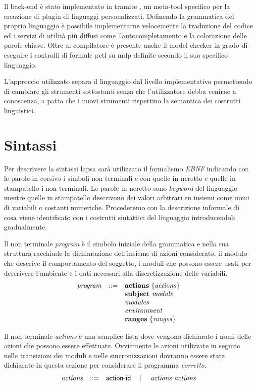 Il back-end è stato implementato in \java{} tramite \xtext{} \cite{xtext}, un meta-tool specifico per la creazione di plugin \eclipse{} di linguaggi personalizzati. Definendo la grammatica del proprio linguaggio è possibile implementarne velocemente la traduzione del codice ed i servizi di utilità più diffusi come l'autocompletamento e la colorazione delle parole chiave. Oltre al compilatore è presente anche il model checker \prism{} in grado di eseguire i controlli di formule \ac{pctl} su \ac{mdp} definite secondo il suo specifico linguaggio.

L'approccio utilizzato separa il linguaggio dal livello implementativo permettendo di cambiare gli strumenti sottostanti senza che l'utilizzatore debba venirne a conoscenza, a patto che i nuovi strumenti rispettino la semantica dei costrutti linguistici.

\section{Sintassi}
Per descrivere la sintassi \ac{lapsa} sarà utilizzato il formalismo \emph{EBNF} indicando con le parole in corsivo i simboli non terminali e con quelle in neretto e quelle in stampatello i non terminali. Le parole in neretto sono \emph{keyword} del linguaggio mentre quelle in stampatello descrivono dei valori arbitrari su insiemi come nomi di variabili o costanti numeriche. Procederemo con la descrizione informale di cosa viene identificato con i costrutti sintattici del linguaggio introducendoli gradualmente.

Il non terminale \emph{program} è il simbolo iniziale della grammatica e nella sua struttura racchiude la dichiarazione dell'insieme di azioni considerato, il modulo che descrive il comportamento del soggetto, i moduli che possono essere usati per descrivere l'ambiente e i dati necessari alla discretizzazione delle variabili.
$$
\begin{array}{rcl}
	\mathit{program} &::=& \mathbf{actions} \mbox{ } \{ \mathit{actions} \} \\
		&& \mathbf{subject} \mbox{ } \mathit{module} \\
		&& \mathit{modules} \\
		&& \mathit{environment} \\
		&& \mathbf{ranges} \mbox{ } \{ \mathit{ranges} \} \\
\end{array}
$$

Il non terminale \emph{actions} è una semplice lista dove vengono dichiarate i nomi delle azioni che possono essere effettuate. Ovviamente le azioni utilizzate in seguito nelle transizioni dei moduli e nelle sincronizzazioni dovranno essere state dichiarate in questa sezione per considerare il programma \emph{corretto}.
$$
\begin{array}{rcl}
	\mathit{actions} &::=& {\sf action}\textrm{-}{\sf id} \quad\mid\quad \mathit{actions} \mbox{ } \mathit{actions} \\
\end{array}
$$

